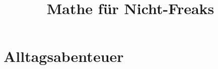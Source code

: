 \documentclass[a4paper]{book}
\title{Mathe für Nicht-Freaks}
\theoremstyle{definition}
\begin{document}
\maketitle
\tableofcontents\newpage

\part{Alltagsabenteuer}
\label{Altagabenteuer}


\end{document}
